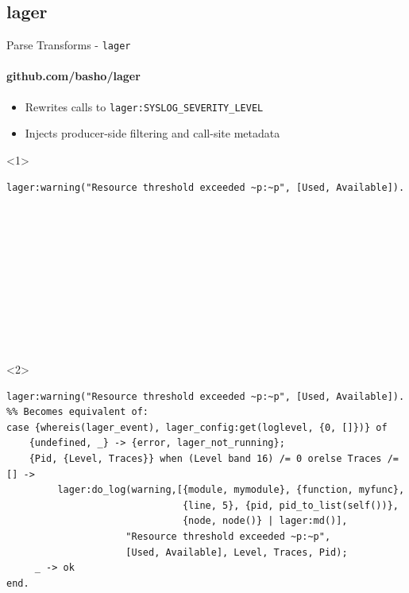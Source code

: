 \documentclass[c]{beamer}
\begin{document}
\subsection{lager}
\begin{frame}[fragile,t]{Parse Transforms - \texttt{lager}}
  \framesubtitle{github.com/basho/lager}
  \begin{itemize}
  \item Rewrites calls to \texttt{lager:SYSLOG\_SEVERITY\_LEVEL}
  \item Injects producer-side filtering and call-site metadata
  \end{itemize}
  \begin{onlyenv}<1>
  \begin{lstlisting}
lager:warning("Resource threshold exceeded ~p:~p", [Used, Available]).











  \end{lstlisting}
  \end{onlyenv}

    \begin{onlyenv}<2>
  \begin{lstlisting}[emph={Used,Available,warning}]
lager:warning("Resource threshold exceeded ~p:~p", [Used, Available]).
%% Becomes equivalent of:
case {whereis(lager_event), lager_config:get(loglevel, {0, []})} of
    {undefined, _} -> {error, lager_not_running};
    {Pid, {Level, Traces}} when (Level band 16) /= 0 orelse Traces /= [] ->
         lager:do_log(warning,[{module, mymodule}, {function, myfunc},
                               {line, 5}, {pid, pid_to_list(self())},
                               {node, node()} | lager:md()],
                     "Resource threshold exceeded ~p:~p",
                     [Used, Available], Level, Traces, Pid);
     _ -> ok
end.
  \end{lstlisting}
  \end{onlyenv}
\end{frame}
\end{document}
